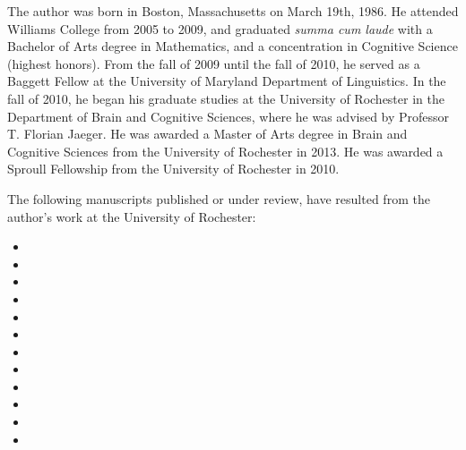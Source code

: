 \begin{curriculumvitae}
  The author was born in Boston, Massachusetts on March 19th, 1986. He attended
  Williams College from 2005 to 2009, and graduated \emph{summa cum laude} with
  a Bachelor of Arts degree in Mathematics, and a concentration in Cognitive Science
  (highest honors). From the fall of 2009 until the fall of 2010, he served as a
  Baggett Fellow at the University of Maryland Department of Linguistics. In the
  fall of 2010, he began his graduate studies at the University of Rochester in
  the Department of Brain and Cognitive Sciences, where he was advised by
  Professor T. Florian Jaeger. He was awarded a Master of Arts degree in Brain and
  Cognitive Sciences from the University of Rochester in 2013. He was awarded a
  Sproull Fellowship from the University of Rochester in 2010.

  The following manuscripts published or under review, have resulted from the
  author's work at the University of Rochester:

  \begin{itemize}
  \item {}
  \item {}
  \item {}
  \item {}
  \item {}
  \item {}
  \item {}
  \item {}
  \item {}
  \item {}
  \item {}
  \item {}
  \end{itemize}

\end{curriculumvitae}

